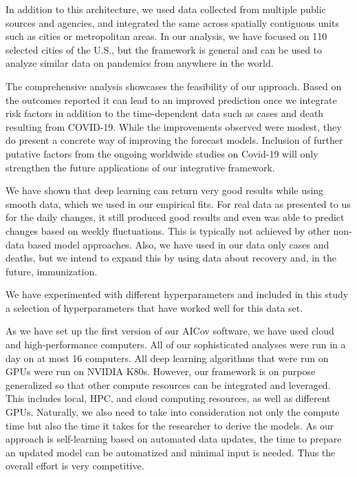 \documentclass[12pt]{article}
\theoremstyle{definition}
\renewcommand{\_}{%
    \textunderscore\hspace{0pt}%
}
\begin{document}
In addition to this architecture, we used data collected from multiple public sources and agencies, and integrated the same across spatially contiguous units such as cities or metropolitan areas. In our analysis, we have focused on 110 selected cities of the U.S., but the framework is general and can be used to analyze similar data on pandemics from anywhere in the world.

The comprehensive analysis showcases the feasibility of our approach. Based on the outcomes reported it can lead to an improved prediction once we integrate risk factors in addition to the time-dependent data such as cases and death resulting from COVID-19. While the improvements observed were modest, they do present a concrete way of improving the forecast models. Inclusion of further putative factors from the ongoing worldwide studies on Covid-19 will only strengthen the future applications of our integrative framework.

We have shown that deep learning can return very good results while using smooth data, which we used in our empirical fits. For real data as presented to us for the daily changes, it still produced good results and even was able to predict changes based on weekly fluctuations. This is typically not achieved by other non-data based model approaches. Also, we have used in our data only cases and deaths, but we intend to expand this by using data about recovery and, in the future, immunization.

We have experimented with different hyperparameters and included in this study a selection of hyperparameters that have worked well for this data set. 


As we have set up the first version of our AICov software, we have used cloud and high-performance computers. All of our sophisticated analyses were run in a day on at most 16 computers. All deep learning algorithms that were run on GPUs were run on NVIDIA K80s. However, our framework is on purpose generalized so that other compute resources can be integrated and leveraged. This includes local, HPC, and cloud computing resources, as well as different GPUs. Naturally, we also need to take into consideration not only the compute time but also the time it takes for the researcher to derive the models. As our approach is self-learning based on automated data updates, the time to prepare an updated model can be automatized and minimal input is needed. Thus the overall effort is very competitive.
\end{document}
